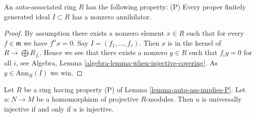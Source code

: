 \begin{lemma}
\label{lemma-auto-ass-implies-P}
An auto-associated ring $R$ has the following property: (P)
Every proper finitely generated ideal $I \subset R$ has a nonzero
annihilator.
\end{lemma}

\begin{proof}
By assumption there exists a nonzero element $x \in R$ such that for every
$f \in \mathfrak m$ we have $f^n x = 0$. Say $I = (f_1, \ldots, f_r)$.
Then $x$ is in the kernel of $R \to \bigoplus R_{f_i}$. Hence we see
that there exists a nonzero $y \in R$ such that $f_i y = 0$ for all $i$, see
Algebra, Lemma \ref{algebra-lemma-when-injective-covering}.
As $y \in \text{Ann}_R(I)$ we win.
\end{proof}

\begin{lemma}
\label{lemma-P-universally-injective}
Let $R$ be a ring having property (P) of
Lemma \ref{lemma-auto-ass-implies-P}.
Let $u : N \to M$ be a homomorphism of projective $R$-modules.
Then $u$ is universally injective if and only if $u$ is injective.
\end{lemma}

